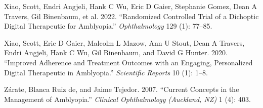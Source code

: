 \documentclass[
  sn-apa,
  pdflatex]{sn-jnl}
\theoremstyle{thmstyleone}%
\theoremstyle{thmstyletwo}%
\theoremstyle{thmstylethree}%
\newenvironment{CSLReferences}%
  {}%
  {\par}
\begin{document}
\begin{CSLReferences}{1}{0}
\leavevmode{}%
Xiao, Scott, Endri Angjeli, Hank C Wu, Eric D Gaier, Stephanie Gomez,
Dean A Travers, Gil Binenbaum, et al. 2022. {``Randomized Controlled
Trial of a Dichoptic Digital Therapeutic for Amblyopia.''}
\emph{Ophthalmology} 129 (1): 77--85.

\leavevmode{}%
Xiao, Scott, Eric D Gaier, Malcolm L Mazow, Ann U Stout, Dean A Travers,
Endri Angjeli, Hank C Wu, Gil Binenbaum, and David G Hunter. 2020.
{``Improved Adherence and Treatment Outcomes with an Engaging,
Personalized Digital Therapeutic in Amblyopia.''} \emph{Scientific
Reports} 10 (1): 1--8.

\leavevmode{}%
Zárate, Blanca Ruiz de, and Jaime Tejedor. 2007. {``Current Concepts in
the Management of Amblyopia.''} \emph{Clinical Ophthalmology (Auckland,
NZ)} 1 (4): 403.

\end{CSLReferences}


\end{document}
